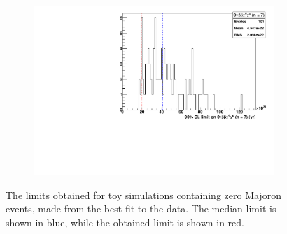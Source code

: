 \documentclass[herrin-thesis.tex]{subfiles}
\begin{document}
\begin{figure}[htb]
\begin{subfigure}[c]{0.48\textwidth}
	\end{subfigure}\hfill%
	\begin{subfigure}[c]{0.48\textwidth}
	\centering
	\includegraphics[width=\textwidth]{./plots/analysis_bb0nX7_sensitivity.pdf}
	\end{subfigure}
\caption[Sensitivity studies for \(0\nu\beta\beta\chi^0(\chi^0)\)]{The limits obtained for toy simulations containing zero Majoron events, made from the best-fit to the data. The median limit is shown in blue, while the obtained limit is shown in red.}
\label{fig:analysis_bb0nX_sensitivity}
\end{figure}
\end{document}
